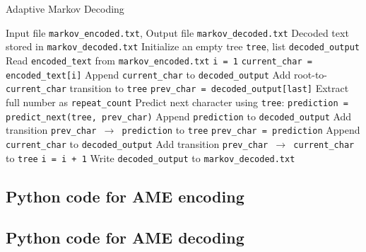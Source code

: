 \documentclass[12pt,twoside]{article}
\begin{document}
\begin{appendices}
\begin{algorithm}
    \caption{Adaptive Markov Decoding}
    \label{alg:markov_decode}
    \begin{algorithmic}[1]
    \REQUIRE Input file \texttt{markov\_encoded.txt}, Output file \texttt{markov\_decoded.txt}
    \ENSURE Decoded text stored in \texttt{markov\_decoded.txt}
    \STATE Initialize an empty tree \texttt{tree}, list \texttt{decoded\_output}
    \STATE Read \texttt{encoded\_text} from \texttt{markov\_encoded.txt}
    \STATE \texttt{i = 1}
        \STATE \texttt{current\_char = encoded\_text[i]}
            \STATE Append \texttt{current\_char} to \texttt{decoded\_output}
            \STATE Add root-to-\texttt{current\_char} transition to \texttt{tree}
        \ELSE
            \STATE \texttt{prev\_char = decoded\_output[last]}
                \STATE Extract full number as \texttt{repeat\_count}
                \STATE Predict next character using \texttt{tree}: \texttt{prediction = predict\_next(tree, prev\_char)}
                    \STATE Append \texttt{prediction} to \texttt{decoded\_output}
                    \STATE Add transition \texttt{prev\_char $\to$ prediction} to \texttt{tree}
                    \STATE \texttt{prev\_char = prediction}
                \ENDFOR
            \ELSE
                \STATE Append \texttt{current\_char} to \texttt{decoded\_output}
                \STATE Add transition \texttt{prev\_char $\to$ current\_char} to \texttt{tree}
            \ENDIF
        \ENDIF
        \STATE \texttt{i = i + 1}
    \ENDWHILE
    \STATE Write \texttt{decoded\_output} to \texttt{markov\_decoded.txt}
    \end{algorithmic}
\end{algorithm}

\newpage
\subsection{Python code for AME encoding}
\label{app:markov_encode}


\newpage
\subsection{Python code for AME decoding}
\label{app:markov_decode}


\end{appendices}
\end{document}
